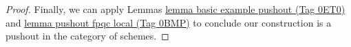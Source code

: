 \documentclass{amsart}
\theoremstyle{plain}
\theoremstyle{definition}
\theoremstyle{remark}
\numberwithin{equation}{subsection}
\begin{document}
\begin{proof}
\medskip\noindent
Finally, we can apply Lemmas \href{https://stacks.math.columbia.edu/tag/0ET0}{lemma basic example pushout (Tag 0ET0)} and
\href{https://stacks.math.columbia.edu/tag/0BMP}{lemma pushout fpqc local (Tag 0BMP)} to conclude our construction is a pushout
in the category of schemes.
\end{proof}
\end{document}
